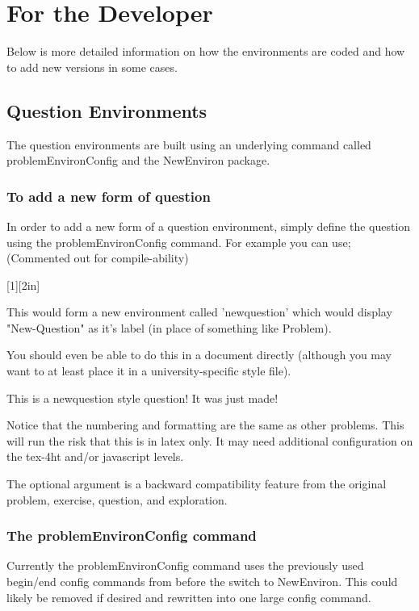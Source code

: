 \documentclass{ximera}
\begin{document}
\section{For the Developer}
Below is more detailed information on how the environments are coded and how to add new versions in some cases.

\subsection{Question Environments}
The question environments are built using an underlying command called problemEnvironConfig and the NewEnviron package. 
\subsubsection{To add a new form of question}
In order to add a new form of a question environment, simply define the question using the problemEnvironConfig command. For example you can use; (Commented out for compile-ability)

[1][2in]
{
}

This would form a new environment called 'newquestion' which would display "New-Question" as it's label (in place of something like Problem).

You should even be able to do this in a document directly (although you may want to at least place it in a university-specific style file).

\begin{newquestion}
This is a newquestion style question! It was just made!
\end{newquestion}

Notice that the numbering and formatting are the same as other problems. This will run the risk that this is in latex only. It may need additional configuration on the tex-4ht and/or javascript levels.

The optional argument is a backward compatibility feature from the original problem, exercise, question, and exploration.

\subsubsection{The problemEnvironConfig command}
Currently the problemEnvironConfig command uses the previously used begin/end config commands from before the switch to NewEnviron. This could likely be removed if desired and rewritten into one large config command.
\end{document}
